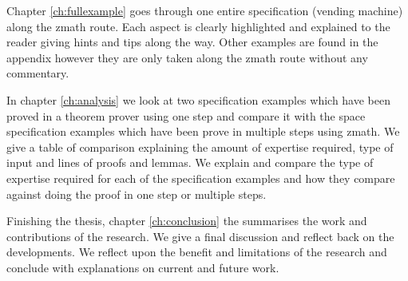 Chapter \ref{ch:fullexample} goes through one entire specification (vending machine) along the \gls{zmath} route. Each aspect is clearly highlighted and explained to the reader giving hints and tips along the way. Other examples are found in the appendix however they are only taken along the \gls{zmath} route without any commentary.

In chapter \ref{ch:analysis} we look at two specification examples which have been proved in a theorem prover using one step and compare it with the space specification examples which have been prove in multiple steps using \gls{zmath}. We give a table of comparison explaining the amount of expertise required, type of input and lines of proofs and lemmas. We explain and compare the type of expertise required for each of the specification examples and how they compare against doing the proof in one step or multiple steps.

Finishing the thesis, chapter \ref{ch:conclusion} the summarises the work and contributions of the research. We give a final discussion and reflect back on the developments. We reflect upon the benefit and limitations of the research and conclude with explanations on current and future work.
